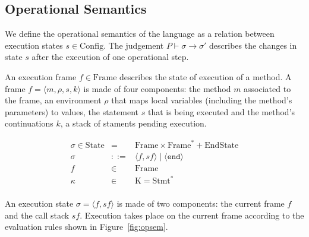 \documentclass[10pt,notitlepage,twoside]{article}
\newcommand{\eframe}[4]{\langle #1, #2, #3, #4 \rangle}
\newcommand{\state}[2]{\langle #1, #2 \rangle}
\newcommand{\stateend}{\langle \texttt{end} \rangle}
\begin{document}
\subsection{Operational Semantics}\label{sec:opsem}

We define the operational semantics of the language as a relation between execution states $s \in \textrm{Config}$.
The judgement $P \vdash \sigma \rightarrow \sigma'$ describes the changes in state $s$ after the execution of one operational step.  

An execution frame $f \in \textrm{Frame}$ describes the state of execution of a method. A frame $f = \eframe{m}{\rho}{s}{k}$ is made of four components: the method $m$ associated to the frame, an environment $\rho$ that maps local variables (including the method's parameters) to values, the statement $s$ that is being executed and the method's continuations $k$, a stack of staments pending execution.

\begin{displaymath}
\begin{array}{rcl}
\sigma \in \textrm{State} & = & \textrm{Frame} \times \textrm{Frame}^* + \textrm{EndState}  \\
\sigma & ::= & \state{f}{sf} \mid \stateend\\
f & \in & \textrm{Frame} \\
\kappa & \in & \textrm{K} =  \textrm{Stmt}^* \\
\end{array}
\end{displaymath}

An execution state $\sigma = \state{f}{sf}$ is  made of two components: the current frame $f$ and the call stack $sf$.
Execution takes place on the current frame according to the evaluation rules shown in Figure~\ref{fig:opsem}.
\end{document}
